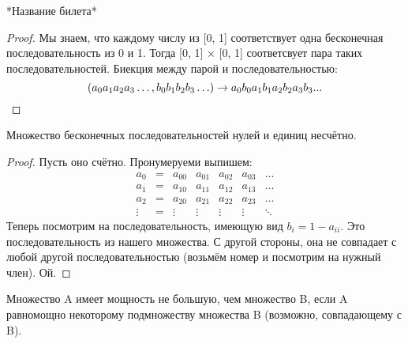 
\begin{theorem} \thmslashn

	*Название билета*
	\begin{proof} \thmslashn
	
		Мы знаем, что каждому числу из [0, 1] соответствует одна бесконечная последовательность из 0 и 1. Тогда [0, 1] × [0, 1] соответсвует пара таких последовательностей. Биекция между парой и последовательностью:
		\[(a_0a_1a_2a_3\ldots, b_0b_1b_2b_3\ldots) \rightarrow a_0b_0a_1b_1a_2b_2a_3b_3...\qedhere\]
	\end{proof}
\end{theorem}


\begin{theorem} \thmslashn

	 Множество бесконечных последовательностей нулей и единиц несчётно.
	\begin{proof} \thmslashn
	
		Пусть оно счётно. Пронумеруеми выпишем:
		\begin{equation*}
			\begin{matrix}
				a_0 & = & a_{00} & a_{01} & a_{02} & a_{03} & \ldots \\
				a_1 & = & a_{10} & a_{11} & a_{12} & a_{13} & \ldots \\
				a_2 & = & a_{20} & a_{21} & a_{22} & a_{23} & \ldots \\
				\vdots & = & \vdots & \vdots & \vdots & \vdots & \ddots 
			\end{matrix}
		\end{equation*}
		Теперь посмотрим на последовательность, имеющую вид $b_i = 1 - a_{ii}$. Это последовательность из нашего множества. С другой стороны, она не совпадает с любой другой последовательностью (возьмём номер и посмотрим на нужный член). Ой.
	\end{proof}
\end{theorem}


\begin{definition} \thmslashn

	Множество A имеет мощность не большую, чем множество B, если A равномощно некоторому подмножеству множества B (возможно, совпадающему с B).
\end{definition}

